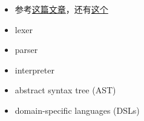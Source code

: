 
\begin{issues}
\issueDraft
\end{issues}

\begin{itemize}
\item 参考\href{https://www.toptal.com/scala/writing-an-interpreter}{这篇文章}，还有\href{https://www.youtube.com/watch?v=Xu4RtLlm42I}{这个}
\item lexer
\item parser
\item interpreter
\item abstract syntax tree (AST)
\item domain-specific languages (DSLs)
\end{itemize}
